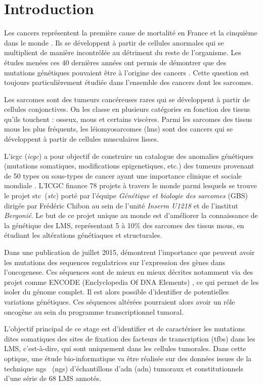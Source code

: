 \chapter*{Introduction}

Les cancers représentent la première cause de mortalité en France \citep{Insee} et la cinquième dans le monde \citep{OMS}. Ils se développent à partir de cellules anormales qui se multiplient de manière incontrôlée au détriment du reste de l'organisme. Les études menées ces 40 dernières années ont permis de démontrer que des mutations génétiques pouvaient être à l'origine des cancers \citep{Cancer}. Cette question est toujours particulièrement étudiée dans l'ensemble des cancers dont les \gls{sarcomes}.

Les sarcomes sont des tumeurs cancéreuses rares qui se développent à partir de \gls{cellules conjonctives}. On les classe en plusieurs catégories en fonction des tissus qu'ils touchent : osseux, mous et certains viscères. Parmi les sarcomes des tissus mous les plus fréquents, les léiomyosarcomes (\acrshort{lms}) sont des cancers qui se développent à partir de cellules musculaires lisses.

L'\acrlong{icgc} (\textit{\acrshort{icgc}}) a pour objectif de construire un catalogue des anomalies génétiques (\gls{mutations somatiques}, \gls{modifications epigenetiques}, etc.) des tumeurs provenant de 50 types ou sous-types de cancer ayant une importance clinique et sociale mondiale \citep{ICGC}. L'ICGC finance 78 projets à travers le monde parmi lesquels se trouve le projet \og \acrlong{stc}\fg ~(\textit{\acrshort{stc}}) porté par l'équipe \textit{Génétique et biologie des sarcomes} (GBS) dirigée par Frédéric Chibon au sein de l'unité \textit{Inserm U1218} et de l'institut \textit{Bergonié}. Le but de ce projet unique au monde est d'améliorer la connaissance de la génétique des LMS, représentant 5 à 10\% des sarcomes des tissus mous, en étudiant les altérations génétiaques et structurales.

Dans une publication de juillet 2015, \citeauthor{Melton} démontrent l'importance que peuvent avoir les mutations des \gls{sequences regulatrices} sur l'expression des gènes dans l'\gls{oncogenese}. Ces séquences sont de mieux en mieux décrites notamment via des projet comme ENCODE (Enclyclopedia Of DNA Elements) \citep{encode}, ce qui permet de les isoler du génome complet. Il est alors possible d'identifier de potentielles variations génétiques. Ces séquences altérées pourraient alors avoir un rôle oncogène au sein du programme transcriptionnel tumoral. 

L'objectif principal de ce stage est d'identifier et de caractériser les mutations dites somatiques des sites de fixation des facteurs de transcription (\acrshort{tfbs}) dans les LMS, c'est-à-dire, qui sont uniquement dans les cellules tumorales. Dans cette optique, une étude bio-informatique va être réalisée sur des données issues de la technique \og \acrlong{ngs} \fg ~(\acrshort{ngs}) d'échantillons d'\acrlong{adn} (\acrshort{adn}) tumoraux et constitutionnels d'une série de 68 LMS annotés. 




